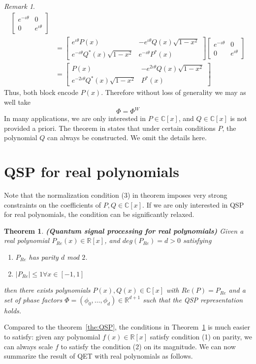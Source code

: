 \documentclass[12pt, oneside]{book}
\newtheorem{theorem}{Theorem}[section]
\theoremstyle{definition}
\theoremstyle{definition}
\theoremstyle{remark}
\newtheorem*{remark}{Remark}
\begin{document}
\begin{remark}
\begin{align*}
\begin{bmatrix}
    e^{-\iota \theta} & 0 \\
    0 & e^{\iota \theta}
    \end{bmatrix}\\
    &=\begin{bmatrix}
    e^{\iota \theta}P(x) & -e^{\iota \theta}Q(x)\sqrt{1-x^2}\\
    e^{-\iota \theta}Q^*(x)\sqrt{1-x^2} & e^{-\iota \theta}P^*(x)
\end{bmatrix}\begin{bmatrix}
    e^{-\iota \theta} & 0 \\
    0 & e^{\iota \theta}
    \end{bmatrix}\\
    &=\begin{bmatrix}
    P(x) & -e^{2\iota \theta}Q(x)\sqrt{1-x^2}\\
    e^{-2\iota \theta}Q^*(x)\sqrt{1-x^2} & P^*(x)
\end{bmatrix}
\end{align*}
Thus, both block encode $P(x)$.
Therefore without loss of generality we may as well take
\[
\Phi=\Phi^W
\]
In many applications, we are only interested in $P \in \mathbb{C}[x]$, and $Q \in \mathbb{C}[x]$ is not provided a priori. The theorem in \cite{gilyen2019quantum} states that under certain conditions $P$, the polynomial $Q$ can always be constructed. We omit the details here.
\end{remark}

\section{QSP for real polynomials}
Note that the normalization condition (3) in theorem imposes very strong constraints on the coefficients of $P, Q \in \mathbb{C}[x]$. If we are only interested in QSP for real polynomials, the condition can be significantly relaxed.

\begin{theorem}\label{the:QSP_real}
    \textbf{(Quantum signal processing for real polynomials)} Given a real polynomial $P_{Re}(x) \in \mathbb{R}[x]$, and $deg(P_{Re})=d > 0$ satisfying
    \begin{enumerate}
        \item $P_{Re}$ has parity $d$ mod $2$.
        \item $|P_{Re}| \leq 1 \forall x \in [-1,1]$
    \end{enumerate}
    then there exists polynomials $P(x),Q(x) \in \mathbb{C}[x]$ with $Re(P)=P_{Re}$ and a set of phase factors $\Phi = (\phi_0,\ldots, \phi_d) \in \mathbb{R}^{d+1}$ such that the QSP representation holds.
\end{theorem}
Compared to the theorem~\ref{the:QSP}, the conditions in Theorem~\ref{the:QSP_real} is much easier to satisfy: given any polynomial $f(x)\in\mathbb{R}[x]$ satisfy condition (1) on parity, we can always scale $f$ to satisfy the condition (2) on its magnitude. We can now summarize the result of QET with real polynomials as follows.
\end{document}
